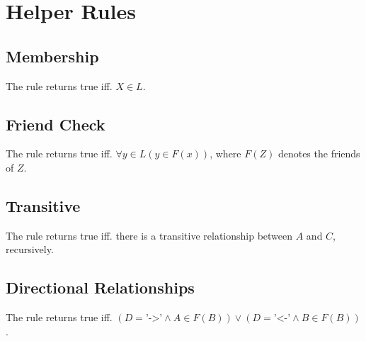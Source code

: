 %
%

\section{Helper Rules}
\label{helpers}

\subsection{Membership}
\label{appendix:member_of}
The  rule returns true iff. $X \in L$.

\subsection{Friend Check}
\label{appendix:friendCheck}
The  rule returns true iff. $\forall y \in L ( y \in F(x)
)$, where $F(Z)$ denotes the friends of $Z$.

\subsection{Transitive}
\label{appendix:transitive}
The  rule returns true iff. there is a transitive
relationship between $A$ and $C$, recursively.

\subsection{Directional Relationships}
\label{appendix:drel}
The  rule returns true iff. $( D = \text{'->'} \land A \in F(B) )
\lor ( D = \text{'<-'} \land B \in F(B) )$.
